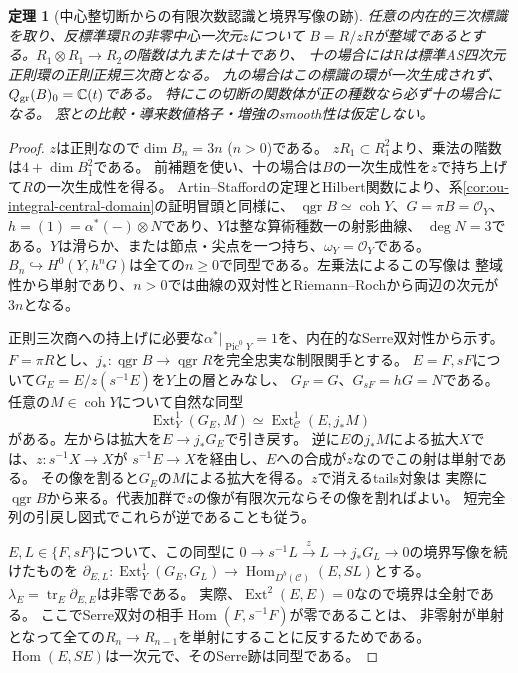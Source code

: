 \documentclass[11pt,a4paper]{ltjsarticle}
\newtheorem{theorem}{定理}[section]
\theoremstyle{definition}
\newcommand{\qgr}{\operatorname{qgr}}
\newcommand{\coh}{\operatorname{coh}}
\newcommand{\Pic}{\operatorname{Pic}}
\begin{document}
\begin{theorem}[中心整切断からの有限次数認識と境界写像の跡]
\label{thm:ou-central-trace-recognition}
任意の内在的三次標識を取り、反標準環$R$の非零中心一次元$z$について
$B=R/zR$が整域であるとする。$R_1\otimes R_1\to R_2$の階数は九または十であり、
十の場合には$R$は標準AS四次元正則環の正則正規三次商となる。
九の場合はこの標識の環が一次生成されず、$Q_{\rm gr}(B)_0=\mathbb C(t)$である。
特にこの切断の関数体が正の種数なら必ず十の場合になる。
窓との比較・導来数値格子・増強のsmooth性は仮定しない。
\end{theorem}
\begin{proof}
$z$は正則なので$\dim B_n=3n$ ($n>0$)である。
$zR_1\subset R_1^2$より、乗法の階数は$4+\dim B_1^2$である。
前補題を使い、十の場合は$B$の一次生成性を$z$で持ち上げて$R$の一次生成性を得る。
Artin--Staffordの定理とHilbert関数により、系\ref{cor:ou-integral-central-domain}の証明冒頭と同様に、
$\qgr B\simeq\coh Y$、$G=\pi B=\mathcal O_Y$、
$h=(1)=\alpha^*(-)\otimes N$であり、$Y$は整な算術種数一の射影曲線、
$\deg N=3$である。$Y$は滑らか、または節点・尖点を一つ持ち、$\omega_Y=\mathcal O_Y$である。
$B_n\hookrightarrow H^0(Y,h^nG)$は全ての$n\ge0$で同型である。左乗法によるこの写像は
整域性から単射であり、$n>0$では曲線の双対性とRiemann--Rochから両辺の次元が$3n$となる。

正則三次商への持上げに必要な$\alpha^*|_{\Pic^0 Y}=1$を、内在的なSerre双対性から示す。
$F=\pi R$とし、$j_*:\qgr B\to\qgr R$を完全忠実な制限関手とする。
$E=F,sF$について$G_E=E/z(s^{-1}E)$を$Y$上の層とみなし、
$G_F=G$、$G_{sF}=hG=N$である。任意の$M\in\coh Y$について自然な同型
\[
 \operatorname{Ext}^1_Y(G_E,M)\simeq\operatorname{Ext}^1_{\mathcal C}(E,j_*M)
\]
がある。左からは拡大を$E\to j_*G_E$で引き戻す。
逆に$E$の$j_*M$による拡大$X$では、$z:s^{-1}X\to X$が
$s^{-1}E\to X$を経由し、$E$への合成が$z$なのでこの射は単射である。
その像を割ると$G_E$の$M$による拡大を得る。$z$で消えるtails対象は
実際に$\qgr B$から来る。代表加群で$z$の像が有限次元ならその像を割ればよい。
短完全列の引戻し図式でこれらが逆であることも従う。

$E,L\in\{F,sF\}$について、この同型に
$0\to s^{-1}L\xrightarrow{z}L\to j_*G_L\to0$の境界写像を続けたものを
$\partial_{E,L}:\operatorname{Ext}^1_Y(G_E,G_L)\to
\operatorname{Hom}_{D^b(\mathcal C)}(E,S L)$とする。
$\lambda_E=\operatorname{tr}_E\partial_{E,E}$は非零である。
実際、$\operatorname{Ext}^2(E,E)=0$なので境界は全射である。
ここでSerre双対の相手$\operatorname{Hom}(F,s^{-1}F)$が零であることは、
非零射が単射となって全ての$R_n\to R_{n-1}$を単射にすることに反するためである。
$\operatorname{Hom}(E,SE)$は一次元で、そのSerre跡は同型である。


\end{proof}
\end{document}
